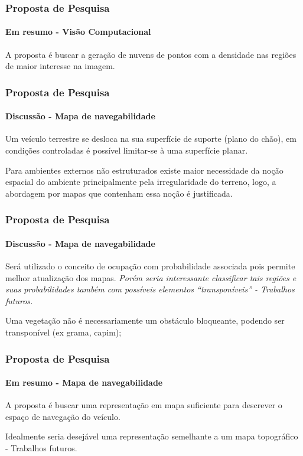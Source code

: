 \documentclass[brazil]{beamer}
\begin{document}
\begin{frame}
\frametitle{Proposta de Pesquisa}
\framesubtitle{Em resumo - Visão Computacional}
\begin{block}{}
A proposta é buscar a geração de nuvens de pontos com a densidade nas regiões de maior
interesse na imagem. 
\end{block}
\end{frame}


\begin{frame}
\frametitle{Proposta de Pesquisa}
\framesubtitle{Discussão - Mapa de navegabilidade}
\begin{block}{}
Um veículo terrestre se desloca na sua superfície de suporte (plano do chão), em condições controladas é
possível limitar-se à uma superfície planar.
\end{block}
\begin{block}{}
Para ambientes externos não estruturados existe maior necessidade da noção espacial 
do ambiente principalmente pela irregularidade do terreno, logo, a abordagem por mapas
que contenham essa noção é justificada. 
\end{block}
\end{frame}


\begin{frame}
\frametitle{Proposta de Pesquisa}
\framesubtitle{Discussão - Mapa de navegabilidade}
\begin{block}{}
Será utilizado o conceito de ocupação com probabilidade associada pois permite melhor atualização dos mapas.
\textit{Porém seria interessante classificar tais regiões e suas 
probabilidades também com possíveis elementos ``transponíveis'' - Trabalhos futuros.}
\end{block}
\begin{block}{}
Uma vegetação não é necessariamente um obstáculo bloqueante, podendo ser transponível (ex grama, capim);
\end{block}
\end{frame}


\begin{frame}
\frametitle{Proposta de Pesquisa}
\framesubtitle{Em resumo - Mapa de navegabilidade}
\begin{block}{}
A proposta é buscar uma representação em mapa suficiente para descrever o espaço de navegação
do veículo.
\end{block}
\begin{block}{}
Idealmente seria desejável uma representação semelhante a um mapa topográfico - Trabalhos futuros.
\end{block}
\end{frame}
\end{document}
